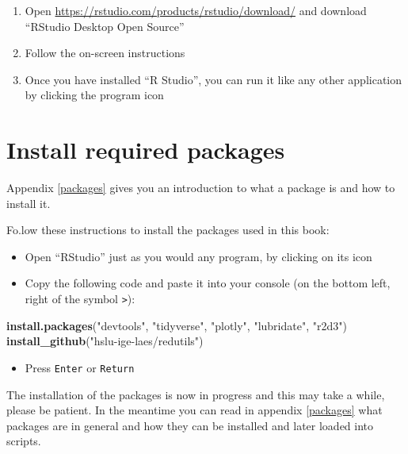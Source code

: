 \documentclass[
  a4paperpaper,
]{book}
\newenvironment{Shaded}{\begin{snugshade}}{\end{snugshade}}
\newcommand{\KeywordTok}[1]{\textcolor[rgb]{0.13,0.29,0.53}{\textbf{#1}}}
\newcommand{\NormalTok}[1]{#1}
\newcommand{\StringTok}[1]{\textcolor[rgb]{0.31,0.60,0.02}{#1}}
\providecommand{\tightlist}{%
  \setlength{\itemsep}{0pt}\setlength{\parskip}{0pt}}
\let\oldShaded\Shaded
\let\endoldShaded\endShaded
\renewenvironment{Shaded}{\footnotesize\oldShaded}{\endoldShaded}
\begin{document}
\begin{enumerate}
\def\labelenumi{\arabic{enumi}.}
\tightlist
\item
  Open \url{https://rstudio.com/products/rstudio/download/} and download ``RStudio Desktop Open Source''
\item
  Follow the on-screen instructions
\item
  Once you have installed ``R Studio'', you can run it like any other application by clicking the program icon
\end{enumerate}

\newpage

\hypertarget{installationPackages}{%
\section{Install required packages}\label{installationPackages}}

Appendix \ref{packages} gives you an introduction to what a package is and how to install it.

Fo.low these instructions to install the packages used in this book:

\begin{itemize}
\item
  Open ``RStudio'' just as you would any program, by clicking on its icon
\item
  Copy the following code and paste it into your console (on the bottom left, right of the symbol \texttt{\textgreater{}}):
\end{itemize}

\begin{Shaded}
\begin{Highlighting}[]
\KeywordTok{install.packages}\NormalTok{(}\StringTok{"devtools"}\NormalTok{, }\StringTok{"tidyverse"}\NormalTok{, }\StringTok{"plotly"}\NormalTok{, }\StringTok{"lubridate"}\NormalTok{, }\StringTok{"r2d3"}\NormalTok{)}
\KeywordTok{install_github}\NormalTok{(}\StringTok{"hslu-ige-laes/redutils"}\NormalTok{)}
\end{Highlighting}
\end{Shaded}

\begin{itemize}
\tightlist
\item
  Press \texttt{Enter} or \texttt{Return}
\end{itemize}

The installation of the packages is now in progress and this may take a while, please be patient. In the meantime you can read in appendix \ref{packages} what packages are in general and how they can be installed and later loaded into scripts.
\end{document}
